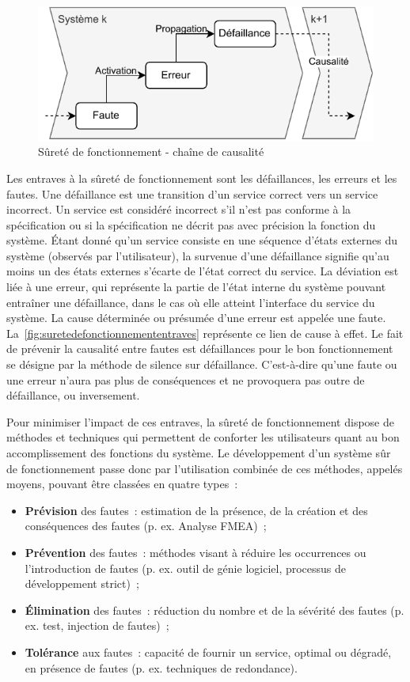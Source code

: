 \documentclass[french, a4paper, 11pt, twoside, pdftex]{StyleThese}
\begin{document}
		\begin{figure}[h!]
			\centering
			\includegraphics[width=0.7\linewidth]{schemas/SureteDeFonctionnement_Entraves}
			\caption{Sûreté de fonctionnement - chaîne de causalité}
			\label{fig:suretedefonctionnemententraves}
		\end{figure}
		
		Les entraves à la sûreté de fonctionnement sont les défaillances, les erreurs et les fautes. Une défaillance est une transition d’un service correct vers un service incorrect. Un service est considéré incorrect s’il n’est pas conforme à la spécification ou si la spécification ne décrit pas avec précision la fonction du système. Étant donné qu’un service consiste en une séquence d’états externes du système (observés par l’utilisateur), la survenue d’une défaillance signifie qu’au moins un des états externes s’écarte de l’état correct du service. La déviation est liée à une erreur, qui représente la partie de l’état interne du système pouvant entraîner une défaillance, dans le cas où elle atteint l’interface du service du système. La cause déterminée ou présumée d’une erreur est appelée une faute. La~\autoref{fig:suretedefonctionnemententraves} représente ce lien de cause à effet. Le fait de prévenir la causalité entre fautes est défaillances pour le bon fonctionnement se désigne par la méthode de silence sur défaillance. C'est-à-dire qu'une faute ou une erreur n'aura pas plus de conséquences et ne provoquera pas outre de défaillance, ou inversement.
	
		
		Pour minimiser l’impact de ces entraves, la sûreté de fonctionnement dispose de méthodes et techniques qui permettent de conforter les utilisateurs quant au bon accomplissement des fonctions du système. Le développement d’un système sûr de fonctionnement passe donc par l’utilisation combinée de ces méthodes, appelés moyens, pouvant être classées en quatre types~:
		\begin{itemize}
			\item \textbf{Prévision} des fautes~: estimation de la présence, de la création et des conséquences des fautes (p. ex. Analyse FMEA)~;
			\item \textbf{Prévention} des fautes~: méthodes visant à réduire les occurrences ou l’introduction de fautes (p. ex. outil de génie logiciel, processus de développement strict)~;
			\item \textbf{Élimination} des fautes~: réduction du nombre et de la sévérité des fautes (p. ex. test, injection de fautes)~;
			\item \textbf{Tolérance} aux fautes~: capacité de fournir un service, optimal ou dégradé, en présence de fautes (p. ex. techniques de redondance).
		\end{itemize}
	
\end{document}

